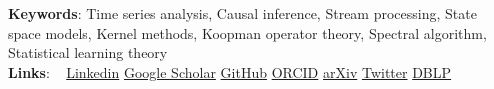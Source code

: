 \textbf{Keywords}:
Time series analysis, Causal inference, Stream processing, State space models, Kernel methods, Koopman operator theory, Spectral algorithm, Statistical learning theory
\vspace{0.2em}
\\
\textbf{Links}:
~\faLinkedin{} \href{https://www.linkedin.com/in/\Linkedin}{Linkedin}
\Separator{}
\faGraduationCap{} \href{https://scholar.google.com/citations?hl=en&user=\Gscholar}{Google Scholar}
\Separator{}
\faGithub{} \href{https://github.com/\GitHubProfile}{GitHub}
\Separator{}
\faOrcid{} \href{https://orcid.org/\ORCID}{ORCID}
\Separator{}
\faArxiv{} \href{https://arxiv.org/search/cs?query=Chihara,N&searchtype=all}{arXiv}
\Separator{}
\faTwitter{} \href{https://x.com/\Twitter}{Twitter}
\Separator{}
\faDblp{} \href{https://dblp.org/pid/363/1658.html}{DBLP}
\vspace{0.5em}
